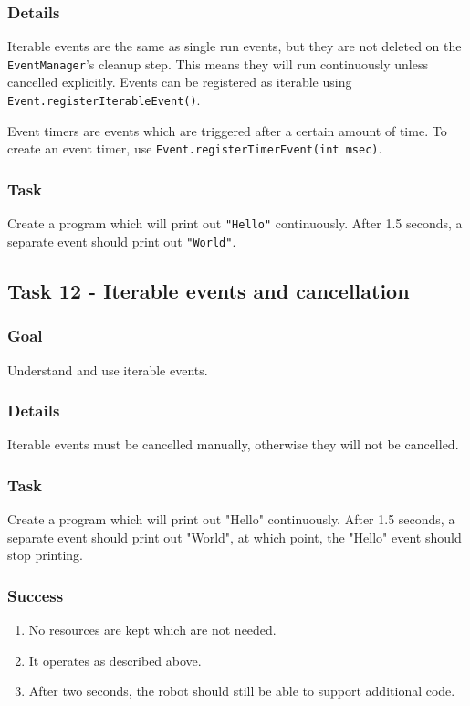 \documentclass[a4paper]{article}
\begin{document}
\subsubsection{Details} Iterable events are the same as single run events, but they are not deleted on the \lstinline{EventManager}'s cleanup step. This means they will run continuously unless cancelled explicitly. Events can be registered as iterable using \lstinline{Event.registerIterableEvent()}. 

Event timers are events which are triggered after a certain amount of time. To create an event timer, use \lstinline{Event.registerTimerEvent(int msec)}.
\subsubsection{Task} Create a program which will print out \lstinline{"Hello"} continuously. After 1.5 seconds, a separate event should print out \lstinline{"World"}. 

\subsection{Task 12 - Iterable events and cancellation}
\subsubsection{Goal} Understand and use iterable events.
\subsubsection{Details} Iterable events must be cancelled manually, otherwise they will not be cancelled.
\subsubsection{Task} Create a program which will print out "Hello" continuously. After 1.5 seconds, a separate event should print out "World", at which point, the "Hello" event should stop printing. 
\subsubsection{Success} \begin{enumerate}\item{No resources are kept which are not needed.}\item{It operates as described above.}\item{After two seconds, the robot should still be able to support additional code.}\end{enumerate}
\end{document}
